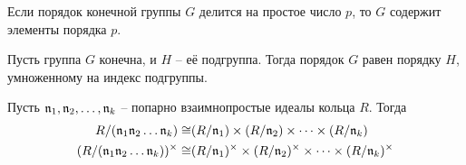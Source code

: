 \documentclass[_dissertation.tex]{subfiles}
\begin{document}
\begin{statement}\label{statement:cauchy}
    Если порядок конечной группы $G$ делится на простое число $p$, то $G$ содержит элементы порядка $p$.
\end{statement}

\begin{statement}\label{statement:lagrange}
    Пусть группа $G$ конечна, и $H$ -- её подгруппа.
    Тогда порядок $G$ равен порядку $H$, умноженному на индекс подгруппы.
\end{statement}

\begin{statement}\label{statement:chinese_remainder_theorem}
    Пусть $\mathfrak{n}_1, \mathfrak{n}_2, \dots, \mathfrak{n}_k$ -- попарно взаимнопростые идеалы кольца $R$.
    Тогда
    \begin{equation*}
        \begin{split}
            R/(\mathfrak{n}_1\mathfrak{n}_2\dots\mathfrak{n}_k) \cong & (R/\mathfrak{n}_1) \times (R/\mathfrak{n}_2) \times \dots \times (R/\mathfrak{n}_k)\\
            (R/(\mathfrak{n}_1\mathfrak{n}_2\dots\mathfrak{n}_k))^{\times} \cong & (R/\mathfrak{n}_1)^{\times} \times (R/\mathfrak{n}_2)^{\times} \times \dots \times (R/\mathfrak{n}_k)^{\times}
        \end{split}
    \end{equation*}
\end{statement}

\onlyinsubfile{
    
    
}
\end{document}
